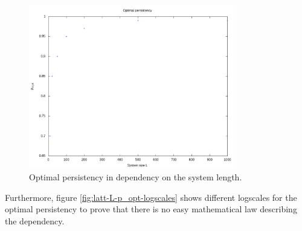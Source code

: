 \documentclass[]{scrartcl}
\begin{document}
\begin{figure}[!hbt]
 \centering
 \includegraphics[width=0.8\textwidth]{./fig/latt/L/p_opt.png}
 \caption{Optimal persistency in dependency on the system length.}
 \label{fig:latt-L-p_opt}
\end{figure}

Furthermore, figure \ref{fig:latt-L-p_opt-logscales} shows different logscales for the optimal persistency to prove that there is no easy mathematical law describing the dependency.
 
\end{document}
